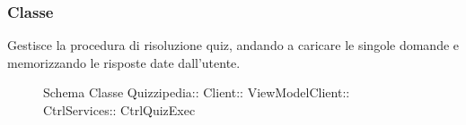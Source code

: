 \subsubsection{Classe }
Gestisce la procedura di risoluzione quiz, andando a caricare le singole domande e memorizzando le risposte date dall'utente.
\begin{figure}[H]
\centering
\noindent{}
\caption[Schema Classe CtrlQuizExec]{Schema Classe Quizzipedia:: Client:: ViewModelClient:: CtrlServices:: CtrlQuizExec}
\end{figure}
